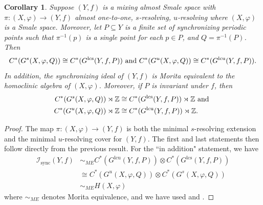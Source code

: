 \documentclass{amsart}
\newcommand{\Z}{{\mathbb Z}}
\newcommand{\lcu}{\text{lcu}}
\newcommand{\lcs}{\text{lcs}}
\theoremstyle{plain}
\newtheorem{corollary}[theorem]{Corollary}
\theoremstyle{definition}
\theoremstyle{remark}
\begin{document}
\begin{corollary}
Suppose $(Y, f)$ is a mixing almost Smale space with $\pi : (X, \varphi) \rightarrow (Y, f)$ almost one-to-one, $s$-resolving, $u$-resolving where $(X, \varphi)$ is a Smale space. Moreover, let $P \subseteq Y$ is a finite set of synchronizing periodic points such that $\pi^{-1}(p)$ is a single point for each $p\in P$, and $Q=\pi^{-1}(P)$. Then 
\[
C^*(G^s(X, \varphi, Q)) \cong C^*(G^\lcs(Y, f, P)) \hbox{ and } C^*(G^u(X, \varphi, Q)) \cong C^*(G^\lcu(Y, f, P)).
\]
In addition, the synchronizing ideal of $(Y, f)$ is Morita equivalent to the homoclinic algebra of $(X, \varphi)$. Moreover, if $P$ is invariant under $f$, then
\begin{align*}
C^*(G^s(X, \varphi, Q)) \rtimes \Z & \cong C^*(G^\lcs(Y, f, P))\rtimes \Z \hbox{ and }  \\
C^*(G^u(X, \varphi, Q))\rtimes \Z & \cong C^*(G^\lcu(Y, f, P))\rtimes \Z.
\end{align*}
\end{corollary}
\begin{proof}
The map $\pi: (X, \varphi) \rightarrow (Y, f)$ is both the minimal $s$-resolving extension and the minimal $u$-resolving cover for $(Y, f)$. The first and last statements then follow directly from the previous result. For the ``in addition" statement, we have
\begin{align*}
\mathcal{I}_\text{sync}(Y, f) &  \sim_{ME} C^*(G^\lcu(Y, f, P)) \otimes C^*(G^\lcs(Y, f, P)) \\
& \cong C^*(G^u(X, \varphi, Q)) \otimes C^*(G^s(X, \varphi, Q)) \\
& \sim_{ME} H(X, \varphi)
\end{align*}
where $\sim_{ME}$ denotes Morita equivalence, and we have used \cite[Theorem 3.1]{putnam_1996} and \cite[Theorem 6.1 part (i)]{DeeSto}.
\end{proof}
\end{document}

